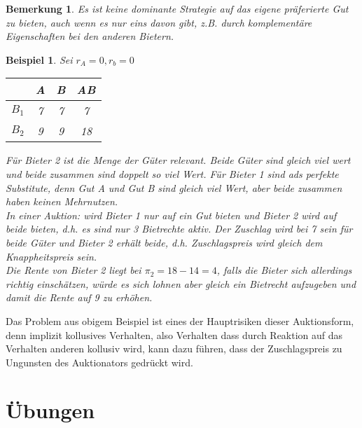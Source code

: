 \documentclass[12pt]{extreport} %
\theoremstyle{named}
\theoremstyle{itshape}
\theoremstyle{normal}
\newtheorem{beispiel}[unnamedtheorem]{Beispiel}
\newtheorem*{bemerkung}{Bemerkung}
\begin{document}
\begin{bemerkung}
	Es ist keine dominante Strategie auf das eigene präferierte Gut zu bieten, auch wenn es nur eins davon gibt, z.B. durch komplementäre Eigenschaften bei den anderen Bietern.	
\end{bemerkung}

\begin{beispiel}
	Sei $r_A = 0, r_b = 0$
	\begin{figure*}[h!] \centering
		\begin{tabular}{l|ccc}
			& A & B & AB \\
  				\hline
  			$B_1$ & 7 & 7 & 7  \\
  			$B_2$ & 9 & 9 & 18  
		\end{tabular}
	\end{figure*}
	Für Bieter 2 ist die Menge der Güter relevant. Beide Güter sind gleich viel wert und beide zusammen sind doppelt so viel Wert. Für Bieter 1 sind ads perfekte Substitute, denn Gut A und Gut B sind gleich viel Wert, aber beide zusammen haben keinen Mehrnutzen. ~\\
	
	In einer Auktion: wird Bieter 1 nur auf ein Gut bieten und Bieter 2 wird auf beide bieten, d.h. es sind nur 3 Bietrechte aktiv. Der Zuschlag wird bei 7 sein für beide Güter und Bieter 2 erhält beide, d.h. Zuschlagspreis wird gleich dem Knappheitspreis sein.~\\
	
	Die Rente von Bieter 2 liegt bei $\pi_2 = 18- 14 = 4$, falls die Bieter sich allerdings richtig einschätzen, würde es sich lohnen aber gleich ein Bietrecht aufzugeben und damit die Rente auf 9 zu erhöhen.
\end{beispiel}


Das Problem aus obigem Beispiel ist eines der Hauptrisiken dieser Auktionsform, denn implizit kollusives Verhalten, also Verhalten dass durch Reaktion auf das Verhalten anderen kollusiv wird, kann dazu führen, dass der Zuschlagspreis zu Ungunsten des Auktionators gedrückt wird.


\newpage

 \appendix {}  

\chapter*{Übungen}
\end{document}
